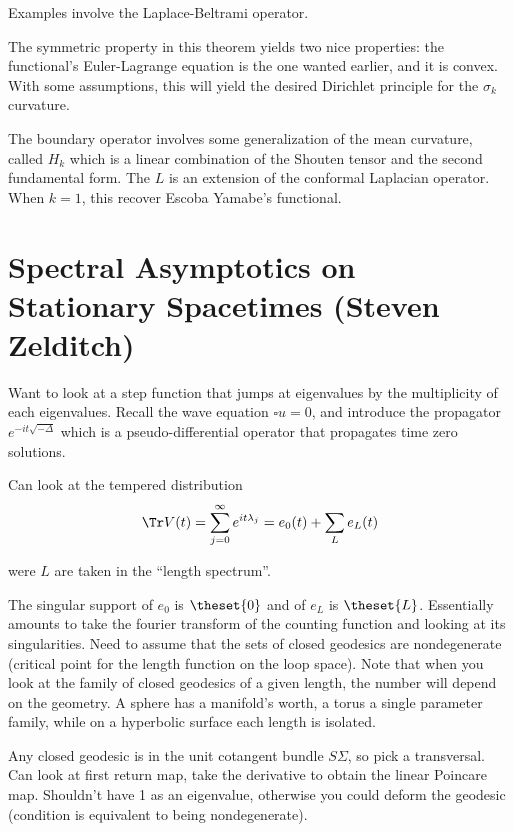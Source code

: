 Examples involve the Laplace-Beltrami operator.

The symmetric property in this theorem yields two nice properties: the
functional's Euler-Lagrange equation is the one wanted earlier, and it
is convex. With some assumptions, this will yield the desired Dirichlet
principle for the \(\sigma_k\) curvature.

The boundary operator involves some generalization of the mean
curvature, called \(H_k\) which is a linear combination of the Shouten
tensor and the second fundamental form. The \(L\) is an extension of the
conformal Laplacian operator. When \(k=1\), this recover Escoba Yamabe's
functional.

\hypertarget{spectral-asymptotics-on-stationary-spacetimes-steven-zelditch}{%
\section{Spectral Asymptotics on Stationary Spacetimes (Steven
Zelditch)}\label{spectral-asymptotics-on-stationary-spacetimes-steven-zelditch}}

Want to look at a step function that jumps at eigenvalues by the
multiplicity of each eigenvalues. Recall the wave equation
\(\square u = 0\), and introduce the propagator
\(e^{-it\sqrt{-\Delta}}\) which is a pseudo-differential operator that
propagates time zero solutions.

Can look at the tempered distribution \[
\Tr V(t) = \sum_{j=0}^\infty e^{it\lambda_j} = e_0(t) + \sum_{L} e_L(t)
\]

were \(L\) are taken in the ``length spectrum''.

The singular support of \(e_0\) is \(\theset{0}\) and of \(e_L\) is
\(\theset{L}\). Essentially amounts to take the fourier transform of the
counting function and looking at its singularities. Need to assume that
the sets of closed geodesics are nondegenerate (critical point for the
length function on the loop space). Note that when you look at the
family of closed geodesics of a given length, the number will depend on
the geometry. A sphere has a manifold's worth, a torus a single
parameter family, while on a hyperbolic surface each length is isolated.

Any closed geodesic is in the unit cotangent bundle \(S\Sigma\), so pick
a transversal. Can look at first return map, take the derivative to
obtain the linear Poincare map. Shouldn't have 1 as an eigenvalue,
otherwise you could deform the geodesic (condition is equivalent to
being nondegenerate).

